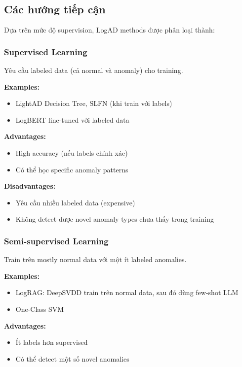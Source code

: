 \subsection{Các hướng tiếp cận}

Dựa trên mức độ supervision, LogAD methods được phân loại thành:

\subsubsection{Supervised Learning}

Yêu cầu labeled data (cả normal và anomaly) cho training.

\textbf{Examples:}
\begin{itemize}
    \item LightAD Decision Tree, SLFN (khi train với labels)
    \item LogBERT fine-tuned với labeled data
\end{itemize}

\textbf{Advantages:}
\begin{itemize}
    \item High accuracy (nếu labels chính xác)
    \item Có thể học specific anomaly patterns
\end{itemize}

\textbf{Disadvantages:}
\begin{itemize}
    \item Yêu cầu nhiều labeled data (expensive)
    \item Không detect được novel anomaly types chưa thấy trong training
\end{itemize}

\subsubsection{Semi-supervised Learning}

Train trên mostly normal data với một ít labeled anomalies.

\textbf{Examples:}
\begin{itemize}
    \item LogRAG: DeepSVDD train trên normal data, sau đó dùng few-shot LLM
    \item One-Class SVM
\end{itemize}

\textbf{Advantages:}
\begin{itemize}
    \item Ít labels hơn supervised
    \item Có thể detect một số novel anomalies
\end{itemize}

